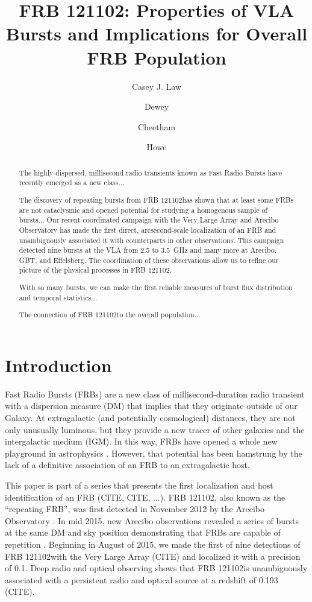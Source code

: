 \documentclass{emulateapj}
\newcommand{\frb}{FRB 121102}
\begin{document}
\title{\frb: Properties of VLA Bursts and Implications for Overall FRB Population}
\shorttitle{\frb\ Burst Properties}

\author{Casey J. Law}
\author{Dewey}
\author{Cheetham}\author{Howe}

\begin{abstract}
The highly-dispersed, millisecond radio transients known as Fast Radio Bursts have recently emerged as a new class...

The discovery of repeating bursts from \frb has shown that at least some FRBs are not cataclysmic and opened potential for studying a homogenous sample of bursts...
Our recent coordinated campaign with the Very Large Array and Arecibo Observatory has made the first direct, arcsecond-scale localization of an FRB and unambiguously associated it with counterparts in other observations. This campaign detected nine bursts at the VLA from 2.5 to 3.5~GHz and many more at Arecibo, GBT, and Effelsberg. The coordination of these observations allow us to refine our picture of the physical processes in \frb.

With so many bursts, we can make the first reliable measures of burst flux distribution and temporal statistics...

The connection of \frb to the overall population...

\end{abstract}

\section{Introduction}
Fast Radio Bursts (FRBs) are a new class of millisecond-duration radio transient with a dispersion measure (DM) that implies that they originate outside of our Galaxy. At extragalactic (and potentially cosmological) distances, they are not only unusually luminous, but they provide a new tracer of other galaxies and the intergalactic medium (IGM). In this way, FRBs have opened a whole new playground in astrophysics \citep[e.g.,][]{2014A&A...562A.137F, 2014ApJ...780L..33M, 2016MNRAS.457..232C}. However, that potential has been hamstrung by the lack of a definitive association of an FRB to an extragalactic host.

This paper is part of a series that presents the first localization and host identification of an FRB (CITE, CITE, ...). \frb, also known as the ``repeating FRB'', was first detected in November 2012 by the Arecibo Observatory \citep{2014ApJ...790..101S}. In mid 2015, new Arecibo observations revealed a series of bursts at the same DM and sky position demonstrating that FRBs are capable of repetition \citep{2016Natur.531..202S}. Beginning in August of 2015, we made the first of nine detections of \frb with the Very Large Array (CITE) and localized it with a precision of 0.1\arcsec. Deep radio and optical observing shows that \frb is unambiguously associated with a persistent radio and optical source at a redshift of 0.193 (CITE).
\end{document}
